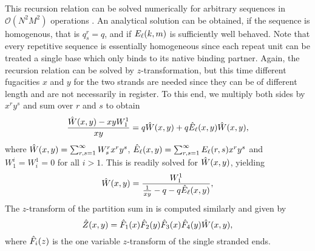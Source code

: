 This recursion relation can be solved numerically for arbitrary sequences in $\mathcal{O}(N^{2}M^{2})$
operations \cite{Garel_Biopolymers_04, Bundschuh_PRE_02}. 
An analytical solution can be obtained, if the sequence is homogenous, that is  $q_{s}^{r}=q$,
and if ${E_{\ell}}(k,m)$ is sufficiently well behaved. Note that every repetitive sequence is essentially homogeneous
since each repeat unit can be treated a single base which only binds to its native binding partner.
Again, the recursion relation can be solved by $z$-transformation, but this time different fugacities $x$ and $y$ 
for the two strands are needed since they can be of different length and are not necessarily in register. 
To this end, we multiply both sides by $x^{r}y^{s}$ and sum over $r$ and $s$ to obtain
\begin{equation}
\label{eq:recursion}
  \frac{\hat{W}(x,y)-xyW_1^{1}}{xy}=q\hat{W}(x,y)+q{\hat{E}_{\ell}}(x,y)\hat{W}(x,y),
\end{equation}
where $\hat{W}(x,y)=\sum_{r,s=1}^{\infty} W_s^{r}x^{r}y^{s}$, ${\hat{E}_{\ell}}(x,y)=\sum_{r,s=1}^{\infty} {E_{\ell}}(r,s)x^{r}y^{s}$ and
$W_1^{i}=W_i^{1}=0$ for all $i>1$. This is readily solved for $\hat{W}(x,y)$, yielding
\begin{equation}
\label{eq:What}
 \hat{W}(x,y) = \frac{W_1^{1}}{\frac{1}{xy}-q-q{\hat{E}_{\ell}}(x,y)},
\end{equation}
The $z$-transform of the partition sum in  is computed similarly and given by 
\begin{equation}
\label{eq:completeZ}
  \hat{Z}(x,y)=\hat{F}_1(x)\hat{F}_2(y)\hat{F}_3(x)\hat{F}_4(y)\hat{W}(x,y),
\end{equation}
where $\hat{F}_i(z)$ is the one variable $z$-transform of the single stranded ends. 

